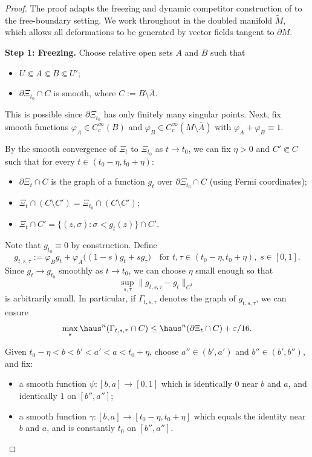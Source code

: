 \begin{proof}
The proof adapts the freezing and dynamic competitor construction of \cite[Lemma~3.1]{DLT13} to the free-boundary setting. We work throughout in the doubled manifold $\widetilde M$, which allows all deformations to be generated by vector fields tangent to $\partial M$.

\noindent\textbf{Step 1: Freezing.}
Choose relative open sets $A$ and $B$ such that
\begin{itemize}
    \item $U\Subset A\Subset B\Subset U'$;
    \item $\partial\Xi_{t_0}\cap C$ is smooth, where $C:=B\setminus\overline A$.
\end{itemize}
This is possible since $\partial\Xi_{t_0}$ has only finitely many singular points. Next, fix smooth functions $\varphi_A\in C_c^\infty(B)$ and $\varphi_B\in C_c^\infty(M\setminus\overline A)$ with $\varphi_A+\varphi_B\equiv 1$.

By the smooth convergence of $\Xi_t$ to $\Xi_{t_0}$ as $t\to t_0$, we can fix $\eta>0$ and $C'\Subset C$ such that for every $t\in(t_0-\eta,t_0+\eta)$:
\begin{itemize}
    \item $\partial\Xi_t\cap C$ is the graph of a function $g_t$ over $\partial\Xi_{t_0}\cap C$ (using Fermi coordinates);
    \item $\Xi_t\cap(C\setminus C')=\Xi_{t_0}\cap(C\setminus C')$;
    \item $\Xi_t\cap C'=\{(z,\sigma):\sigma<g_t(z)\}\cap C'$.
\end{itemize}
Note that $g_{t_0}\equiv 0$ by construction. Define
\[
g_{t,s,\tau}:=\varphi_B g_t+\varphi_A\bigl((1-s)g_t+sg_\tau\bigr)
\quad\text{for }t,\tau\in(t_0-\eta,t_0+\eta),\;s\in[0,1].
\]
Since $g_t\to g_{t_0}$ smoothly as $t\to t_0$, we can choose $\eta$ small enough so that
\[
\sup_{s,\tau}\|g_{t,s,\tau}-g_t\|_{C^1}
\]
is arbitrarily small. In particular, if $\Gamma_{t,s,\tau}$ denotes the graph of $g_{t,s,\tau}$, we can ensure
\[
\max_s\haus^n(\Gamma_{t,s,\tau}\cap C)\le \haus^n(\partial\Xi_t\cap C)+\varepsilon/16.
\]

Given $t_0-\eta<b<b'<a'<a<t_0+\eta$, choose $a''\in(b',a')$ and $b''\in(b',b'')$, and fix:
\begin{itemize}
    \item a smooth function $\psi:[b,a]\to[0,1]$ which is identically $0$ near $b$ and $a$, and identically $1$ on $[b'',a'']$;
    \item a smooth function $\gamma:[b,a]\to[t_0-\eta,t_0+\eta]$ which equals the identity near $b$ and $a$, and is constantly $t_0$ on $[b'',a'']$.
\end{itemize}


\end{proof}
